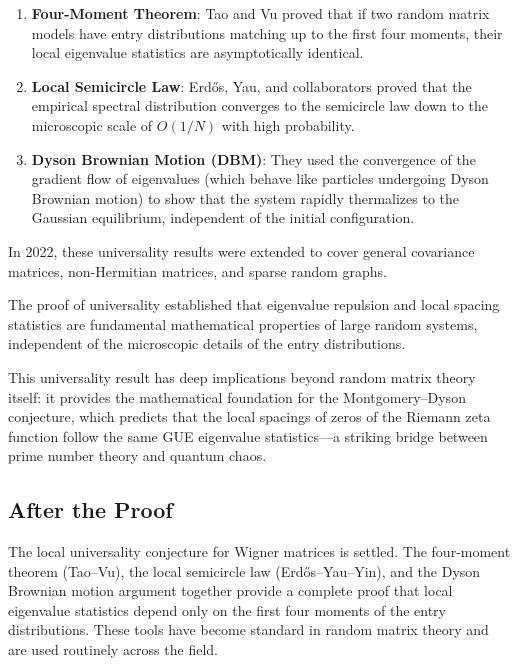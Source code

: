 \begin{enumerate}
\item \textbf{Four-Moment Theorem}: Tao and Vu proved that if two random matrix models have entry distributions matching up to the first four moments, their local eigenvalue statistics are asymptotically identical.
\item \textbf{Local Semicircle Law}: Erdős, Yau, and collaborators proved that the empirical spectral distribution converges to the semicircle law down to the microscopic scale of $O(1/N)$ with high probability.
\item \textbf{Dyson Brownian Motion (DBM)}: They used the convergence of the gradient flow of eigenvalues (which behave like particles undergoing Dyson Brownian motion) to show that the system rapidly thermalizes to the Gaussian equilibrium, independent of the initial configuration.
\end{enumerate}

In 2022, these universality results were extended to cover general covariance matrices, non-Hermitian matrices, and sparse random graphs.

\begin{highlightbox}
The proof of universality established that eigenvalue repulsion and local spacing statistics are fundamental mathematical properties of large random systems, independent of the microscopic details of the entry distributions.
\end{highlightbox}

This universality result has deep implications beyond random matrix theory itself: it provides the mathematical foundation for the Montgomery--Dyson conjecture, which predicts that the local spacings of zeros of the Riemann zeta function follow the same GUE eigenvalue statistics---a striking bridge between prime number theory and quantum chaos.

\subsection{After the Proof}

The local universality conjecture for Wigner matrices is settled. The four-moment theorem (Tao--Vu), the local semicircle law (Erd\H{o}s--Yau--Yin), and the Dyson Brownian motion argument together provide a complete proof that local eigenvalue statistics depend only on the first four moments of the entry distributions. These tools have become standard in random matrix theory and are used routinely across the field.

